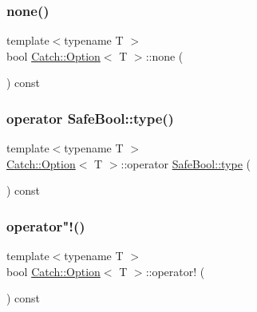 \subsubsection{\texorpdfstring{none()}{none()}}
{\footnotesize\ttfamily template$<$typename T $>$ \\
bool \mbox{\hyperlink{class_catch_1_1_option}{Catch\+::\+Option}}$<$ T $>$\+::none (\begin{DoxyParamCaption}{ }\end{DoxyParamCaption}) const\hspace{0.3cm}{\ttfamily [inline]}}

\mbox{\label{class_catch_1_1_option_a8ed8de7b072f893c85df14913dbbe197}} 
\subsubsection{\texorpdfstring{operator Safe\+Bool\+::type()}{operator SafeBool::type()}}
{\footnotesize\ttfamily template$<$typename T $>$ \\
\mbox{\hyperlink{class_catch_1_1_option}{Catch\+::\+Option}}$<$ T $>$\+::operator \mbox{\hyperlink{class_catch_1_1_safe_bool_a39eef9baed296299d625a54d54a2a958}{Safe\+Bool\+::type}} (\begin{DoxyParamCaption}{ }\end{DoxyParamCaption}) const\hspace{0.3cm}{\ttfamily [inline]}}

\mbox{\label{class_catch_1_1_option_a96dccb86bdf45ee0c08e122b6133bef3}} 
\subsubsection{\texorpdfstring{operator"!()}{operator!()}}
{\footnotesize\ttfamily template$<$typename T $>$ \\
bool \mbox{\hyperlink{class_catch_1_1_option}{Catch\+::\+Option}}$<$ T $>$\+::operator! (\begin{DoxyParamCaption}{ }\end{DoxyParamCaption}) const\hspace{0.3cm}{\ttfamily [inline]}}

